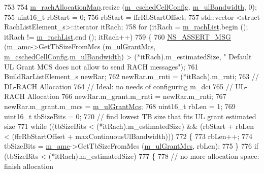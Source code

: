 \begin{DoxyCode}
753 
754   \hyperlink{classns3_1_1PssFfMacScheduler_af093989004d46e1bf45ba2bdb1dfa03e}{m\_rachAllocationMap}.resize (\hyperlink{classns3_1_1PssFfMacScheduler_a6808e2b2024ed0ced82f80bfe6f0801f}{m\_cschedCellConfig}.
      \hyperlink{structns3_1_1FfMacCschedSapProvider_1_1CschedCellConfigReqParameters_a5ab5b102878e6e7e7727a14af4a64d2f}{m\_ulBandwidth}, 0);
755   uint16\_t rbStart = 0;
756   rbStart = ffrRbStartOffset;
757   std::vector <struct RachListElement\_s>::iterator itRach;
758   \textcolor{keywordflow}{for} (itRach = \hyperlink{classns3_1_1PssFfMacScheduler_a7365478ecd213eef5da163ace10a94ed}{m\_rachList}.begin (); itRach != \hyperlink{classns3_1_1PssFfMacScheduler_a7365478ecd213eef5da163ace10a94ed}{m\_rachList}.end (); itRach++)
759     \{
760       \hyperlink{assert_8h_aff5ece9066c74e681e74999856f08539}{NS\_ASSERT\_MSG} (\hyperlink{classns3_1_1PssFfMacScheduler_a0cbf5421430268701ab8a313ab912785}{m\_amc}->GetTbSizeFromMcs (\hyperlink{classns3_1_1PssFfMacScheduler_a535c4d18454b96af02427b81a3b20930}{m\_ulGrantMcs}, 
      \hyperlink{classns3_1_1PssFfMacScheduler_a6808e2b2024ed0ced82f80bfe6f0801f}{m\_cschedCellConfig}.\hyperlink{structns3_1_1FfMacCschedSapProvider_1_1CschedCellConfigReqParameters_a5ab5b102878e6e7e7727a14af4a64d2f}{m\_ulBandwidth}) > (*itRach).m\_estimatedSize, \textcolor{stringliteral}{" Default UL
       Grant MCS does not allow to send RACH messages"});
761       BuildRarListElement\_s newRar;
762       newRar.m\_rnti = (*itRach).m\_rnti;
763       \textcolor{comment}{// DL-RACH Allocation}
764       \textcolor{comment}{// Ideal: no needs of configuring m\_dci}
765       \textcolor{comment}{// UL-RACH Allocation}
766       newRar.m\_grant.m\_rnti = newRar.m\_rnti;
767       newRar.m\_grant.m\_mcs = \hyperlink{classns3_1_1PssFfMacScheduler_a535c4d18454b96af02427b81a3b20930}{m\_ulGrantMcs};
768       uint16\_t rbLen = 1;
769       uint16\_t tbSizeBits = 0;
770       \textcolor{comment}{// find lowest TB size that fits UL grant estimated size}
771       \textcolor{keywordflow}{while} ((tbSizeBits < (*itRach).m\_estimatedSize) && (rbStart + rbLen < (ffrRbStartOffset + 
      maxContinuousUlBandwidth)))
772         \{
773           rbLen++;
774           tbSizeBits = \hyperlink{classns3_1_1PssFfMacScheduler_a0cbf5421430268701ab8a313ab912785}{m\_amc}->GetTbSizeFromMcs (\hyperlink{classns3_1_1PssFfMacScheduler_a535c4d18454b96af02427b81a3b20930}{m\_ulGrantMcs}, rbLen);
775         \}
776       \textcolor{keywordflow}{if} (tbSizeBits < (*itRach).m\_estimatedSize)
777         \{
778           \textcolor{comment}{// no more allocation space: finish allocation}

\end{DoxyCode}
